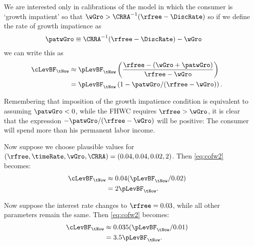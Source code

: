 We are interested only in calibrations of the model in which the consumer is `growth impatient' so that $\wGro > \CRRA^{-1}(\rfree-\DiscRate)$ so if we define the rate of growth impatience as
\begin{equation}\begin{gathered}\begin{aligned} \label{eq:patwGro}
\patwGro & \equiv  \CRRA^{-1}(\rfree-\DiscRate)-\wGro
\end{aligned}\end{gathered}\end{equation}
we can write this as
\begin{equation}\begin{gathered}\begin{aligned}
        \cLevBF_{\tNow} & \approx  \pLevBF_{\tNow} \left(\frac{\rfree - (\wGro+\patwGro)}{\rfree-\wGro}\right)
\\ & =  \pLevBF_{\tNow} \left(1 - \patwGro/(\rfree - \wGro)\right). \label{eq:CvsP}
\end{aligned}\end{gathered}\end{equation}

Remembering that imposition of the growth impatience condition is equivalent to assuming $\patwGro < 0$, while the FHWC requires $\rfree > \wGro$, it is clear that the expression $-\patwGro/(\rfree-\wGro)$ will be positive:  The consumer will spend more than his permanent labor income.

Now suppose we choose plausible values for $(\rfree, \timeRate, \wGro, \CRRA) = (0.04,0.04,0.02,2)$.
Then \eqref{eq:cofw2} becomes:
\begin{equation}\begin{gathered}\begin{aligned}
        \cLevBF_{\tNow} & \approx  0.04 (\pLevBF_{\tNow}/0.02) \\
         & =  2 \pLevBF_{\tNow}.
\end{aligned}\end{gathered}\end{equation}

Now suppose the interest rate changes to $\rfree=0.03$, while all other parameters
remain the same.  Then \eqref{eq:cofw2} becomes:
\begin{equation}\begin{gathered}\begin{aligned}
        \cLevBF_{\tNow} & \approx  0.035 (\pLevBF_{\tNow}/0.01)  \\
         & =  3.5 \pLevBF_{\tNow}.
\end{aligned}\end{gathered}\end{equation}

